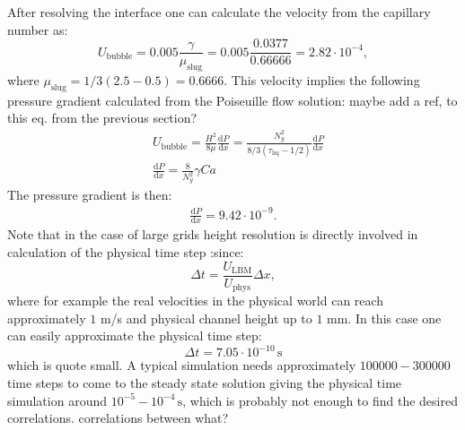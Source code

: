 \documentclass{article}
\newcommand{\todo}[1]{{\color{red}#1}}
\begin{document}
\begin{description}
After resolving the interface one can  calculate the
  velocity from the capillary number as:
  \begin{equation}
  U_{\mathrm{bubble}}=0.005 \frac{\gamma}{\mu_{\mathrm{slug}}}=0.005
\frac{0.0377}{0.66666}=2.82 \cdot10^{-4},
  \end{equation}
  where $\mu_{\mathrm{slug}}=1/3 (2.5-0.5)=0.6666$.
  This velocity implies the following pressure gradient calculated from the
  Poiseuille flow solution: \todo{maybe add a ref, to this eq. from the previous section?}
  \begin{equation}
  \begin{aligned}
  &U_{\mathrm{bubble}}=\frac{H^2}{8\mu} \frac{\mathrm{d}P}{\mathrm{d}x}=\frac{N_y^2}{8/3
  (\tau_{\mathrm{liq}}-1/2)}\frac{\mathrm{d}P}{\mathrm{d}x}\\
  &\frac{\mathrm{d}P}{\mathrm{d}x}=\frac{8}{N_y^2}\gamma Ca
  \end{aligned}
  \end{equation}
  The pressure gradient is then:
  \begin{equation}
  \begin{aligned}
  \frac{\mathrm{d}P}{\mathrm{d}x}=9.42 \cdot 10^{-9}.
  \end{aligned}
  \end{equation}
  Note that in the case of large grids  height resolution is directly
involved in calculation of the physical time step :since:
\begin{equation}
\Delta t =\frac{U_{\mathrm{LBM}}}{U_{\mathrm{phys}}} \Delta x ,
\end{equation}
where for example the real velocities in the physical world can reach
approximately $1$ m/s and physical channel height up to $1$ mm. In this case one
can easily approximate the physical time step:
\begin{equation}
\Delta t = 7.05 \cdot 10^{-10} \,\mathrm{s}
\end{equation}
which is quote small. A typical simulation needs approximately
$100000-300000$ time steps to come to the steady state solution giving the
physical time simulation around $10^{-5}-10^{-4}\,\mathrm{s}$, which is
probably not enough to find the desired correlations. \todo{correlations between what?}


\end{description}
\end{document}
